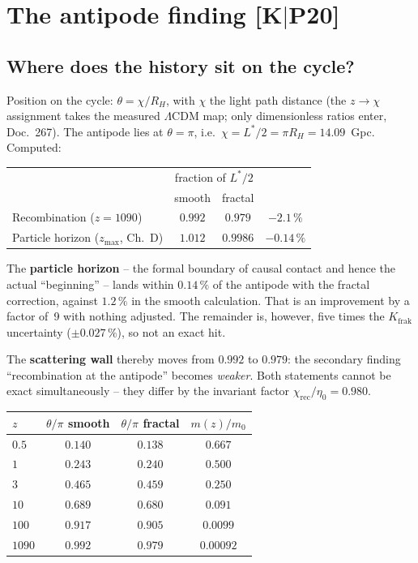 \documentclass[11pt]{report}
\begin{document}
\chapter{The antipode finding [K$|$P20]}

\section{Where does the history sit on the cycle?}

Position on the cycle: $\theta = \chi/R_H$, with $\chi$ the light
path distance (the $z \to \chi$ assignment takes the measured
$\Lambda$CDM map; only dimensionless ratios enter, Doc.~267). The
antipode lies at $\theta = \pi$, i.e.\
$\chi = L^{*}/2 = \pi R_H = 14.09$~Gpc. Computed:

\begin{center}
\begin{tabular}{lccc}
\toprule
 & \multicolumn{2}{c}{fraction of $L^{*}/2$} & \\
 & smooth & fractal & \\
\midrule
Recombination ($z=1090$) & $0.992$ & $0.979$ & $-2.1\,\%$ \\
Particle horizon ($z_\text{max}$, Ch.~D) & $1.012$ & $\mathbf{0.9986}$
  & $\mathbf{-0.14\,\%}$ \\
\bottomrule
\end{tabular}
\end{center}

\noindent The \textbf{particle horizon} -- the formal boundary of
causal contact and hence the actual \enquote{beginning} -- lands
within $0.14\,\%$ of the antipode with the fractal correction,
against $1.2\,\%$ in the smooth calculation. That is an
improvement by a factor of~9 with nothing adjusted. The remainder
is, however, five times the $K_\text{frak}$ uncertainty
($\pm0.027\,\%$), so not an exact hit.

The \textbf{scattering wall} thereby moves from $0.992$ to
$0.979$: the secondary finding \enquote{recombination at the
antipode} becomes \emph{weaker}. Both statements cannot be exact
simultaneously -- they differ by the invariant factor
$\chi_\text{rec}/\eta_0 = 0.980$.

\begin{center}
\begin{tabular}{lccc}
\toprule
$z$ & $\theta/\pi$ smooth & $\theta/\pi$ fractal & $m(z)/m_0$ \\
\midrule
$0.5$ & $0.140$ & $0.138$ & $0.667$ \\
$1$ & $0.243$ & $0.240$ & $0.500$ \\
$3$ & $0.465$ & $0.459$ & $0.250$ \\
$10$ & $0.689$ & $0.680$ & $0.091$ \\
$100$ & $0.917$ & $0.905$ & $0.0099$ \\
$1090$ & $0.992$ & $0.979$ & $0.00092$ \\
\bottomrule
\end{tabular}
\end{center}
\end{document}
